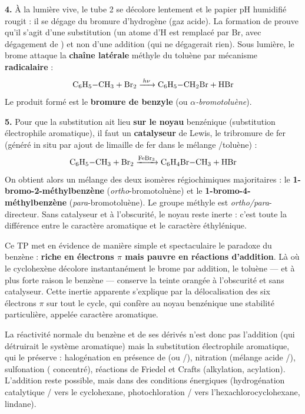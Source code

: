 \documentclass[11pt]{article}
\newcommand{\cle}[1]{{\popxbold\color{popdark}#1}}
\newcounter{popsec}
\newcounter{popsub}
\newcommand{\courssub}[1]{%
  \stepcounter{popsub}%
  \par\vspace{9pt}\noindent{\popxbold\fontsize{11.5}{13}\selectfont\color{popink}{\color{poporange}\thepopsec.\thepopsub}\hspace{6pt}#1}\par\nopagebreak\vspace{4pt}
}
\begin{document}
\begin{exoresolu}
\textbf{4.} À la lumière vive, le tube 2 se décolore lentement et le papier pH humidifié rougit : il se dégage du bromure d'hydrogène  (gaz acide). La formation de  prouve qu'il s'agit d'une \cle{substitution} (un atome d'H est remplacé par Br, avec dégagement de ) et non d'une addition (qui ne dégagerait rien). Sous lumière, le brome attaque la \textbf{chaîne latérale} méthyle du toluène par mécanisme \textbf{radicalaire} :
\[ \ce{C6H5-CH3 + Br2 ->[$h\nu$] C6H5-CH2Br + HBr} \]
Le produit formé est le \textbf{bromure de benzyle} (ou \emph{$\alpha$-bromotoluène}).

\textbf{5.} Pour que la substitution ait lieu \textbf{sur le noyau} benzénique (substitution électrophile aromatique), il faut un \textbf{catalyseur} de Lewis, le tribromure de fer  (généré in situ par ajout de limaille de fer  dans le mélange /toluène) :
\[ \ce{C6H5-CH3 + Br2 ->[FeBr3] C6H4Br-CH3 + HBr} \]
On obtient alors un mélange des deux isomères régiochimiques majoritaires : le \textbf{1-bromo-2-méthylbenzène} (\emph{ortho}-bromotoluène) et le \textbf{1-bromo-4-méthylbenzène} (\emph{para}-bromotoluène). Le groupe méthyle est \emph{ortho/para}-directeur. Sans catalyseur et à l'obscurité, le noyau reste inerte : c'est toute la différence entre le caractère aromatique et le caractère éthylénique.
\end{exoresolu}

\courssub{Conclusion}

Ce TP met en évidence de manière simple et spectaculaire le paradoxe du benzène : \textbf{riche en électrons $\pi$ mais pauvre en réactions d'addition}. Là où le cyclohexène décolore instantanément le brome par addition, le toluène — et à plus forte raison le benzène — conserve la teinte orangée à l'obscurité et sans catalyseur. Cette inertie apparente s'explique par la \cle{délocalisation} des six électrons $\pi$ sur tout le cycle, qui confère au noyau benzénique une stabilité particulière, appelée \cle{caractère aromatique}.

La réactivité normale du benzène et de ses dérivés n'est donc pas l'addition (qui détruirait le système aromatique) mais la \cle{substitution électrophile aromatique}, qui le préserve : halogénation en présence de  (ou /), nitration (mélange acide /), sulfonation ( concentré), réactions de Friedel et Crafts (alkylation, acylation). L'addition reste possible, mais dans des conditions énergiques (hydrogénation catalytique / vers le cyclohexane, photochloration / vers l'hexachlorocyclohexane, lindane).
\end{document}
